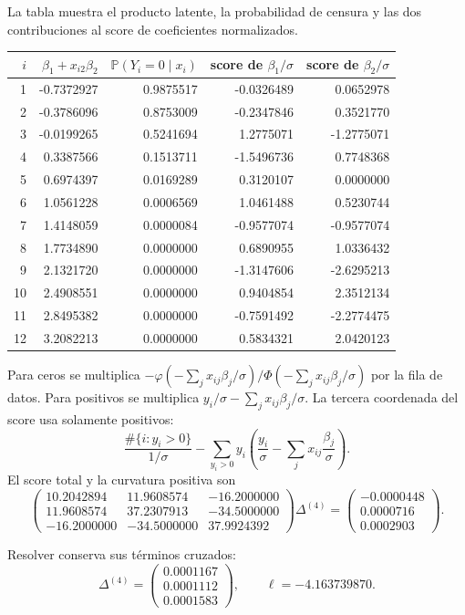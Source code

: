 \documentclass[11pt,a4paper]{article}
\newcommand{\Prob}{\mathbb P}
\begin{document}
La tabla muestra el producto latente,
la probabilidad de censura y
las dos contribuciones al score
de coeficientes normalizados.
\begin{center}\small\begin{tabular}{rrrrr}\toprule
\(i\)&\(\beta_1+x_{i2}\beta_2\)&\(\Prob(Y_i=0\mid x_i)\)&score de \(\beta_1/\sigma\)&score de \(\beta_2/\sigma\)\\\midrule
1&-0.7372927&0.9875517&-0.0326489&0.0652978\\
2&-0.3786096&0.8753009&-0.2347846&0.3521770\\
3&-0.0199265&0.5241694&1.2775071&-1.2775071\\
4&0.3387566&0.1513711&-1.5496736&0.7748368\\
5&0.6974397&0.0169289&0.3120107&0.0000000\\
6&1.0561228&0.0006569&1.0461488&0.5230744\\
7&1.4148059&0.0000084&-0.9577074&-0.9577074\\
8&1.7734890&0.0000000&0.6890955&1.0336432\\
9&2.1321720&0.0000000&-1.3147606&-2.6295213\\
10&2.4908551&0.0000000&0.9404854&2.3512134\\
11&2.8495382&0.0000000&-0.7591492&-2.2774475\\
12&3.2082213&0.0000000&0.5834321&2.0420123\\\bottomrule\end{tabular}\end{center}
Para ceros se multiplica
\(-\varphi(-\sum_jx_{ij}\beta_j/\sigma)/
\Phi(-\sum_jx_{ij}\beta_j/\sigma)\)
por la fila de datos.
Para positivos se multiplica
\(y_i/\sigma-\sum_jx_{ij}\beta_j/\sigma\).
La tercera coordenada del score
usa solamente positivos:
\[
\frac{\#\{i:y_i>0\}}{1/\sigma}
-\sum_{y_i>0}y_i\left(\frac{y_i}{\sigma}
-\sum_jx_{ij}\frac{\beta_j}{\sigma}\right).
\]
El score total y la curvatura positiva son
\[
\begin{pmatrix}10.2042894&11.9608574&-16.2000000\\11.9608574&37.2307913&-34.5000000\\-16.2000000&-34.5000000&37.9924392\end{pmatrix}\Delta^{(4)}=\begin{pmatrix}-0.0000448\\0.0000716\\0.0002903\end{pmatrix}.
\]

Resolver conserva sus términos cruzados:
\[
\Delta^{(4)}=\begin{pmatrix}0.0001167\\0.0001112\\0.0001583\end{pmatrix},\qquad\ell=-4.163739870.
\]
\end{document}

